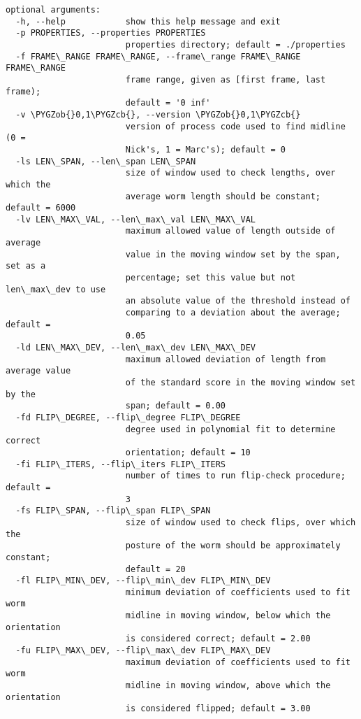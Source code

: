 \documentclass[letterpaper,10pt,openany,oneside]{sphinxmanual}
\def\PYGZob{\char`\{}
\def\PYGZcb{\char`\}}
\begin{document}
\begin{Verbatim}[commandchars=\\\{\}]
optional arguments:
  -h, --help            show this help message and exit
  -p PROPERTIES, --properties PROPERTIES
                        properties directory; default = ./properties
  -f FRAME\_RANGE FRAME\_RANGE, --frame\_range FRAME\_RANGE FRAME\_RANGE
                        frame range, given as [first frame, last frame);
                        default = '0 inf'
  -v \PYGZob{}0,1\PYGZcb{}, --version \PYGZob{}0,1\PYGZcb{}
                        version of process code used to find midline (0 =
                        Nick's, 1 = Marc's); default = 0
  -ls LEN\_SPAN, --len\_span LEN\_SPAN
                        size of window used to check lengths, over which the
                        average worm length should be constant; default = 6000
  -lv LEN\_MAX\_VAL, --len\_max\_val LEN\_MAX\_VAL
                        maximum allowed value of length outside of average
                        value in the moving window set by the span, set as a
                        percentage; set this value but not len\_max\_dev to use
                        an absolute value of the threshold instead of
                        comparing to a deviation about the average; default =
                        0.05
  -ld LEN\_MAX\_DEV, --len\_max\_dev LEN\_MAX\_DEV
                        maximum allowed deviation of length from average value
                        of the standard score in the moving window set by the
                        span; default = 0.00
  -fd FLIP\_DEGREE, --flip\_degree FLIP\_DEGREE
                        degree used in polynomial fit to determine correct
                        orientation; default = 10
  -fi FLIP\_ITERS, --flip\_iters FLIP\_ITERS
                        number of times to run flip-check procedure; default =
                        3
  -fs FLIP\_SPAN, --flip\_span FLIP\_SPAN
                        size of window used to check flips, over which the
                        posture of the worm should be approximately constant;
                        default = 20
  -fl FLIP\_MIN\_DEV, --flip\_min\_dev FLIP\_MIN\_DEV
                        minimum deviation of coefficients used to fit worm
                        midline in moving window, below which the orientation
                        is considered correct; default = 2.00
  -fu FLIP\_MAX\_DEV, --flip\_max\_dev FLIP\_MAX\_DEV
                        maximum deviation of coefficients used to fit worm
                        midline in moving window, above which the orientation
                        is considered flipped; default = 3.00
\end{Verbatim}
\end{document}
